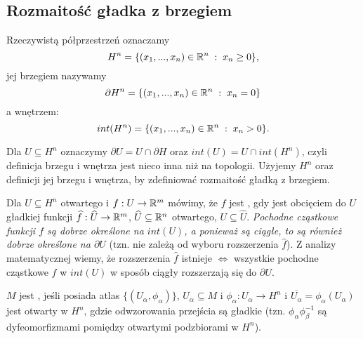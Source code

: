 \subsection{Rozmaitość gładka z brzegiem}

\begin{bbox}
Rzeczywistą półprzestrzeń oznaczamy
$$H^n=\{(x_1,...,x_n)\in\mathbb{R}^n\;:\;x_n\geq 0\},$$
jej brzegiem nazywamy
$$\partial H^n=\{(x_1,...,x_n)\in\mathbb{R}^n\;:\;x_n=0\}$$
a wnętrzem:
$$int(H^n)=\{(x_1,..., x_n)\in\mathbb{R}^n\;:\;x_n>0\}.$$

Dla $U\subseteq H^n$ oznaczymy $\partial U=U\cap \partial H$ oraz $int(U)=U\cap int(H^n)$, czyli definicja brzegu i wnętrza jest nieco inna niż na topologii. Użyjemy $H^n$ oraz definicji jej brzegu i wnętrza, by zdefiniować rozmaitość gładką z brzegiem.
\end{bbox}

Dla $U\subseteq H^n$ otwartego i $f:U\to\mathbb{R}^m$ mówimy, że $f$ jest , gdy jest obcięciem do $U$ gładkiej funkcji $\widehat{f}:\widehat{U}\to\mathbb{R}^m$, $\widehat{U}\subseteq\mathbb{R}^n$ otwartego, $U\subseteq\hat{U}$. \emph{Pochodne cząstkowe funkcji $f$ są dobrze określone na $int(U)$, a ponieważ są ciągłe, to są również dobrze określone na $\partial U$} (tzn. nie zależą od wyboru rozszerzenia $\hat{f}$). Z analizy matematycznej wiemy, że rozszerzenia $\hat{f}$ istnieje $\iff$ wszystkie pochodne cząstkowe $f$ w $int(U)$ w sposób ciągły rozszerzają się do $\partial U$.

\begin{definition}\label{definicja:1.19}
  $M$ jest , jeśli posiada atlas $\{(U_\alpha,\phi_\alpha)\}$, $U_\alpha\subseteq M$ i $\phi_\alpha:U_\alpha\to H^n$ i $\overline{U_\alpha}=\phi_\alpha(U_\alpha)$ jest otwarty w $H^n$, gdzie odwzorowania przejścia są gładkie (tzn. $\phi_\alpha\phi_\beta^{-1}$ są dyfeomorfizmami pomiędzy otwartymi podzbiorami w $H^n$).
\end{definition}

